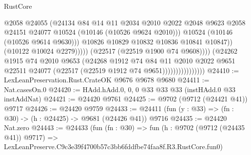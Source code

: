 \begin{lexlean}{RustCore}
\begin{coremodule}
                                              @2058
                                              @24055
                                              (@24134
                                                @84
                                                @14
                                                @11
                                                @2034
                                                @2010
                                                @2022
                                                @2048
                                                @9623
                                                @2058
                                                @24151
                                                @24077
                                                @10524
                                                (@10146 (@10526 @9624 @2010)))
                                              @10524
                                              (@10146 (@10526 @9614 @9630)))
                                            @10826
                                            @10829
                                            @10832
                                            @10836
                                            @10841
                                            @10847))
                                        (@10122 @10024 @2279)))))
                                (@22517 (@22519 @1900 @74 @9608))))
                            (@24262
                              @1915
                              @74
                              @2010
                              @9653
                              (@24268
                                @1912
                                @74
                                @84
                                @11
                                @2010
                                @2022
                                @9651
                                @22511
                                @24077
                                (@22517 (@22519 @1912 @74 @9651))))))))))))))))
@24410 := LexLeanPreservation.Rust.CrateOK @9676 @9678 @9680
@24411 := Nat.casesOn.{0}
@24420 := HAdd.hAdd.{0, 0, 0} @33 @33 @33 (instHAdd.{0} @33 instAddNat)
@24421 := @24420 @9761
@24425 := @9702 (@9712 (@24421 @41)) @9717
@24426 := @24420 @9759
@24433 := @24411 (fun (y : @33) => (fn : @30) -> (h : @24425) -> @9681 (@24426 @41)) @9716
@24435 := @24420 Nat.zero
@24443 := @24433
    (fun (fn : @30) =>
    fun (h : @9702 (@9712 (@24435 @41)) @9717) =>
    LexLeanPreserve.C9c3e39f4700b57c3bb6fddfbe74faa8f.R3.RustCore.fun0)

\end{coremodule}
\end{lexlean}
